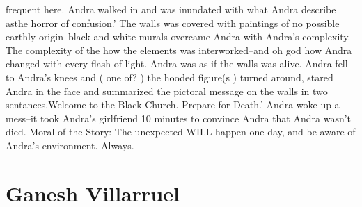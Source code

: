 \documentclass[12pt]{book}
\begin{document}
frequent here. Andra walked in and was inundated with what Andra describe asthe horror of confusion.' The walls was covered with paintings of no possible earthly origin--black and white murals overcame Andra with Andra's complexity. The complexity of the how the elements was interworked--and oh god how Andra changed with every flash of light. Andra was as if the walls was alive. Andra fell to Andra's knees and ( one of? ) the hooded figure(s ) turned around, stared Andra in the face and summarized the pictoral message on the walls in two sentances.Welcome to the Black Church. Prepare for Death.' Andra woke up a mess--it took Andra's girlfriend 10 minutes to convince Andra that Andra wasn't died. Moral of the Story: The unexpected WILL happen one day, and be aware of Andra's environment. Always.






\chapter{Ganesh Villarruel}
\end{document}
